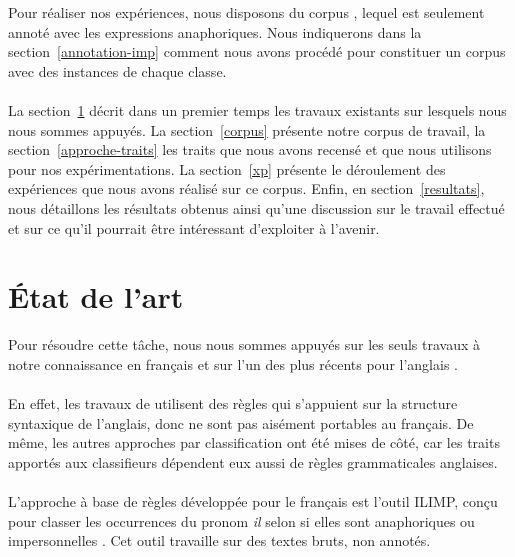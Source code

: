 \documentclass[a4paper,12pt]{article}
\begin{document}
Pour réaliser nos expériences, nous disposons du corpus \cite{tutin-hal-00373327}, lequel est seulement annoté avec les expressions anaphoriques. Nous indiquerons dans la section~\ref{annotation-imp} comment nous avons procédé pour constituer un corpus avec des instances de chaque classe.

\paragraph{}
La section~\ref{etat-art} décrit dans un premier temps les travaux existants sur lesquels nous nous sommes appuyés. La section~\ref{corpus} présente notre corpus de travail, la section~\ref{approche-traits} les traits que nous avons recensé et que nous utilisons pour nos expérimentations.
La section~\ref{xp} présente le déroulement des expériences que nous avons réalisé sur ce corpus.
Enfin, en section~\ref{resultats}, nous détaillons les résultats obtenus ainsi qu'une discussion sur le travail effectué et sur ce qu'il pourrait être intéressant d'exploiter à l'avenir.


\section{État de l'art}
\label{etat-art}

Pour résoudre cette tâche, nous nous sommes appuyés sur les seuls travaux à notre connaissance en français \citep{danlos-ilimp-taln2005} et sur l'un des plus récents pour l'anglais \citep{Bergsma-11}.

\paragraph{}
En effet, les travaux de \citet{Lappin-1994-APA-203987.203989} utilisent des règles qui s'appuient sur la structure syntaxique de l'anglais, donc ne sont pas aisément portables au français. De même, les autres approches par classification ont été mises de côté, car les traits apportés aux classifieurs dépendent eux aussi de règles grammaticales anglaises.

\paragraph{}
L'approche à base de règles développée pour le français est l'outil ILIMP, conçu pour classer les occurrences du pronom \og{}\textit{il}\fg{} selon si elles sont anaphoriques ou impersonnelles \citep{danlos-ilimp-taln2005}. Cet outil travaille sur des textes bruts, non annotés.
\end{document}
